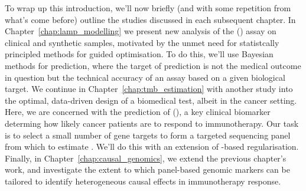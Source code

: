 \documentclass[thesis.tex]{subfiles}
\begin{document}
To wrap up this introduction, we'll now briefly (and with some repetition from what's come before) outline the studies discussed in each subsequent chapter. In Chapter~\ref{chap:lamp_modelling} we present new analysis of the  () assay on clinical and synthetic samples, motivated by the unmet need for statistcally principled methods for guided  optimisation. To do this, we'll use Bayesian methods for prediction, where the target of prediction is not the medical outcome in question but the technical accuracy of an assay based on a given biological target. 
We continue in Chapter~\ref{chap:tmb_estimation} with another study into the optimal, data-driven design of a biomedical test, albeit in the cancer setting. Here, we are concerned with the prediction of  (), a key clinical biomarker determing how likely cancer patients are to respond to immunotherapy. Our task is to select a small number of gene targets to form a targeted  sequencing panel from which to estimate . We'll do this with an extension of -based regularisation. Finally, in Chapter~\ref{chap:causal_genomics}, we extend the previous chapter's work, and investigate the extent to which panel-based genomic markers can be tailored to identify heterogeneous causal effects in immunotherapy response. 

\dobib %
\end{document}
